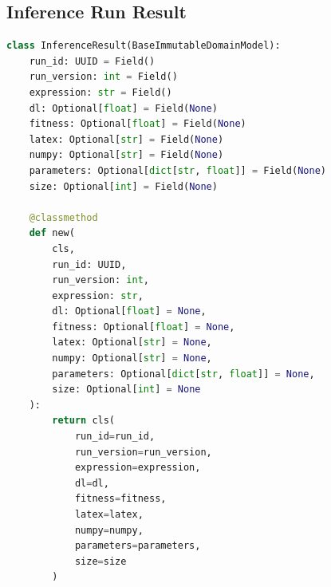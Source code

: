 \begin{apendicesenv}
\chapter{Inference Run Result}
\label{sec:appendix-entity-inference-run-result}
\begin{lstlisting}[language=Python, caption={Classe de domínio que define uma InferenceResult}, label={code:inference_result_domain}]
class InferenceResult(BaseImmutableDomainModel):
    run_id: UUID = Field()
    run_version: int = Field()
    expression: str = Field()
    dl: Optional[float] = Field(None)
    fitness: Optional[float] = Field(None)
    latex: Optional[str] = Field(None)
    numpy: Optional[str] = Field(None)
    parameters: Optional[dict[str, float]] = Field(None)
    size: Optional[int] = Field(None)

    @classmethod
    def new(
        cls,
        run_id: UUID,
        run_version: int,
        expression: str,
        dl: Optional[float] = None,
        fitness: Optional[float] = None,
        latex: Optional[str] = None,
        numpy: Optional[str] = None,
        parameters: Optional[dict[str, float]] = None,
        size: Optional[int] = None
    ):
        return cls(
            run_id=run_id,
            run_version=run_version,
            expression=expression,
            dl=dl,
            fitness=fitness,
            latex=latex,
            numpy=numpy,
            parameters=parameters,
            size=size
        )
\end{lstlisting}


\end{apendicesenv}
